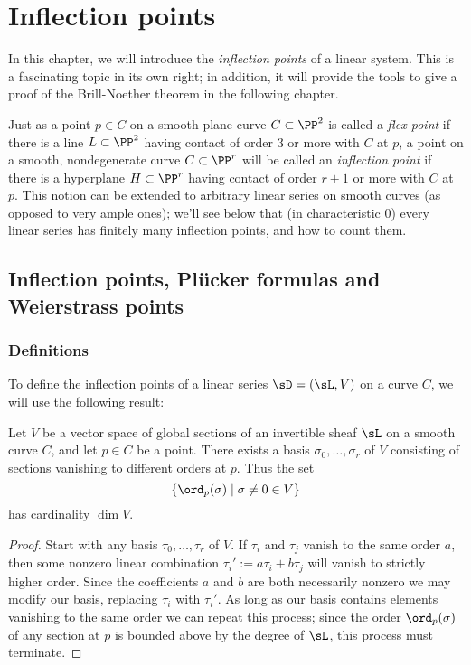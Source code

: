 

\chapter{Inflection points}\label{inflections chapter}
\label{InflectionsChapter}


In this chapter, we will introduce the \emph{inflection points} of a linear system. This is a fascinating topic in its own right; in addition, it will provide the tools to give a proof of the Brill-Noether theorem in the following chapter.

Just as a point $p \in C$ on a smooth plane curve $C \subset \PP^2$ is called a \emph{flex point} if there is a line $L \subset \PP^2$ having contact of order 3 or more with $C$ at $p$, a point on a smooth, nondegenerate curve $C \subset \PP^r$ will be called an \emph{inflection point} if there is a hyperplane $H \subset \PP^r$ having contact of order $r+1$ or more with $C$ at $p$. This notion can be extended to arbitrary linear series on smooth curves (as opposed to very ample ones); we'll see below that (in characteristic 0) every linear series has finitely many inflection points, and how to count them.


\section{Inflection points,  Pl\"ucker formulas and Weierstrass points}

\subsection{Definitions}
To define the inflection points of a linear series $\sD = (\sL, V)$ on a curve $C$, we will use the following result:

\begin{proposition}\label{vanishing sequence} Let $V$ be a vector space of global sections of an invertible sheaf $\sL$ on a smooth curve $C$, and let $p \in C$ be a point. There exists a basis $\sigma_0, \dots, \sigma_r$ of $V$ consisting of sections vanishing to different orders at $p$. Thus the set
$$
\{ \ord_p(\sigma) \mid \sigma \neq 0 \in V \}
$$
 has cardinality $\dim V$.
\end{proposition}

\begin{proof} Start with any basis $\tau_0, \dots, \tau_r$ of $V$. If  $\tau_i$ and $\tau_j$ vanish to the same order $a$, then 
some nonzero linear combination $\tau_i' := a\tau_i+b\tau_j$  will vanish to strictly higher order. Since the coefficients $a$ and $b$ are both necessarily nonzero we may modify our basis, replacing $\tau_i$ with $\tau_i'$. As long as our basis contains elements vanishing to the same order we can repeat this process; since the order $\ord_p(\sigma)$ of any section at $p$ is bounded above by the degree of $\sL$, this process must terminate.
\end{proof}

